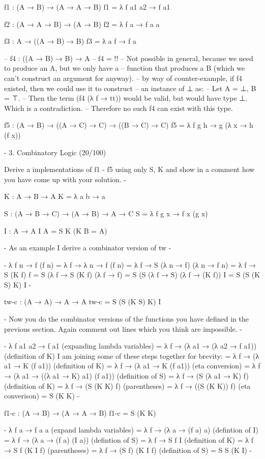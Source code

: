f1 : (A → B) → (A → A → B)
f1 = λ f a1 a2 → f a1

f2 : (A → A → B) → (A → B)
f2 = λ f a → f a a

f3 : A → ((A → B) → B)
f3 = λ a f → f a

-- f4 : ((A → B) → B) → A
-- f4 = {!!}
-- Not possible in general, because we need to produce an A, but we only have a
-- function that produces a B (which we can't construct an argument for anyway).
-- by way of counter-example, if f4 existed, then we could use it to construct
-- an instance of ⊥ as:
--   Let A = ⊥, B = ⊤.
--   Then the term (f4 (λ f → tt)) would be valid, but would have type ⊥. Which is a contradiction.
-- Therefore no such f4 can exist with this type.

f5 : (A → B) → ((A → C) → C) → ((B → C) → C)
f5 = λ f g h → g (λ x → h (f x))

{-
3. Combinatory Logic (20/100)

Derive a implementations of f1 - f5 using only S, K and show in a
comment how you have come up with your solution.
-}

K : A → B → A
K = λ a b → a

S : (A → B → C) → (A → B) → A → C
S = λ f g x → f x (g x)

I : A → A
I {A} = S K (K {B = A})

{- As an example I derive a combinator version of tw -}

{-
λ f n → f (f n)
= λ f → λ n → f (f n)
= λ f → S (λ n → f) (λ n → f n)
= λ f → S (K f) f
= S (λ f → S (K f) (λ f → f)
= S (S (λ f → S) (λ f → (K f)) I
= S (S (K S) K) I
-}

tw-c : (A → A) → A → A
tw-c = S (S (K S) K) I

{- Now you do the combinator versions of the functions you have defined in the previous section. 
   Again comment out lines which you think are impossible.
-}

{-
  λ f a1 a2 → f a1
 (expanding lambda variables)
= λ f → (λ a1 → (λ a2 → f a1))
 (definition of K)
I am joining some of these steps together for brevity:
= λ f → (λ a1 → K (f a1))
 (definition of K)
= λ f → (λ a1 → K (f a1))
 (eta conversion)
= λ f → (λ a1 → ((λ a1 → K) a1) (f a1))
 (definition of S)
= λ f → (S (λ a1 → K) f)
 (definition of K)
= λ f → (S (K K) f)
 (parentheses)
= λ f → ((S (K K)) f)
 (eta converison)
= S (K K)
-}

f1-c : (A → B) → (A → A → B)
f1-c = S (K K)

{-
  λ f a → f a a
 (expand lambda variables)
= λ f → (λ a → (f a) a)
 (defintion of I)
= λ f → (λ a → (f a) (I a))
 (defintion of S)
= λ f → S f I
 (definition of K)
= λ f → S f (K I f)
 (parentheses)
= λ f → (S f) (K I f)
 (definition of S)
= S S (K I)
-}

